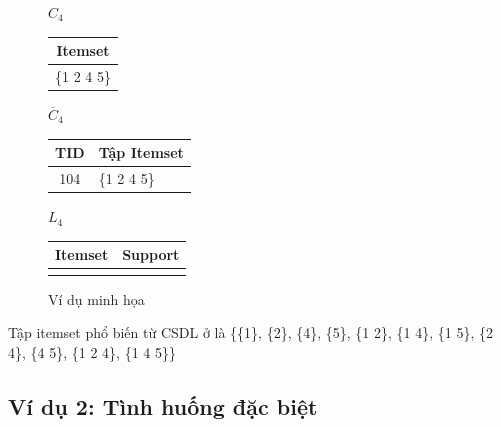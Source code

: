 \documentclass[12pt]{article}
\begin{document}
\begin{figure}[htbp]
    \begin{minipage}[t]{0.22\textwidth}
        \centering
        $C_4$\\[4pt]
        \begin{tabular}{|c|}
        \hline
        Itemset \\ \hline
        \{1 2 4 5\} \\ \hline
        \end{tabular}
    \end{minipage}
    \hfill
    \begin{minipage}[t]{0.45\textwidth}
        \centering
        $\overline{C}_4$\\[4pt]
        \begin{tabular}{|c|l|}
        \hline
        TID & Tập Itemset \\ \hline
        104 & \{1 2 4 5\} \\ \hline
        \end{tabular}
    \end{minipage}
    \hfill
    \begin{minipage}[t]{0.25\textwidth}
        \centering
        $L_4$\\[4pt]
        \begin{tabular}{|c|c|}
        \hline
        Itemset & Support \\ \hline
        & \\ \hline
        \end{tabular}
    \end{minipage}

    \caption{Ví dụ minh họa}
    \label{fig:example}
\end{figure}

Tập itemset phổ biến từ CSDL ở  là \{\{1\}, \{2\}, \{4\}, \{5\}, \{1 2\}, \{1 4\}, \{1 5\}, \{2 4\}, \{4 5\}, \{1 2 4\}, \{1 4 5\}\}

\subsection{Ví dụ 2: Tình huống đặc biệt}
\end{document}

